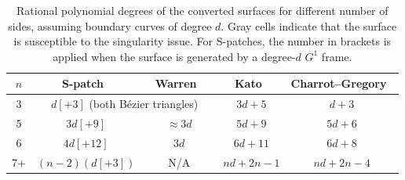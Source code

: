 \documentclass[9pt,academicons]{article}
\begin{document}
\begin{table}
  \centering
  \begin{tabular}{c|c|c|c|c}
    $n$ & S-patch~\cite{Loop:1989} & Warren~\cite{Warren:1992} & Kato~\cite{Kato:1991} & Charrot--Gregory~\cite{Charrot:1984} \\ \hline
    3 & \multicolumn{2}{c|}{$d[+3]$ (both B\'ezier triangles)} & \cellcolor{light-gray}$3d+5$ & $d+3$ \\ \hline
    5 & \cellcolor{light-light-gray}$3d[+9]$ & $\approx 3d$ & \cellcolor{light-gray}$5d+9$ & $5d+6$ \\ \hline
    6 & \cellcolor{light-light-gray}$4d[+12]$ & $3d$ & \cellcolor{light-gray}$6d+11$ & $6d+8$ \\ \hline
    7+ & \cellcolor{light-gray}$(n-2)(d[+3])$ & $\qquad$N/A$\qquad$ & \cellcolor{light-gray}$nd+2n-1$ & \cellcolor{light-gray}$nd+2n-4$ \\ \hline
  \end{tabular}
  \caption{Rational polynomial degrees of the converted surfaces for different number of sides,
    assuming boundary curves of degree $d$. Gray cells indicate that the surface is susceptible to
    the singularity issue.
    For S-patches, the number in brackets is applied
    when the surface is generated by a degree-$d$ $G^1$ frame.}
  \label{tab:degrees}
\end{table}
\end{document}
